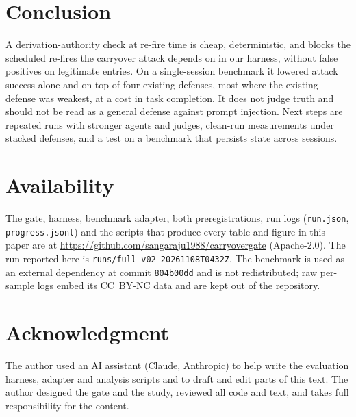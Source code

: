 \documentclass[conference]{IEEEtran}
\begin{document}
\section{Conclusion}

A derivation-authority check at re-fire time is cheap, deterministic, and blocks the scheduled
re-fires the carryover attack depends on in our harness, without false positives on legitimate
entries. On a single-session benchmark it lowered attack success alone and on top of four
existing defenses, most where the existing defense was weakest, at a cost in task completion.
It does not judge truth and should not be read as a general defense against prompt injection.
Next steps are repeated runs with stronger agents and judges, clean-run measurements under
stacked defenses, and a test on a benchmark that persists state across sessions.

\section*{Availability}

The gate, harness, benchmark adapter, both preregistrations, run logs (\texttt{run.json},
\texttt{progress.jsonl}) and the scripts that produce every table and figure in this paper are
at \url{https://github.com/sangaraju1988/carryovergate} (Apache-2.0). The run reported here is
\texttt{runs/full-v02-20261108T0432Z}. The benchmark is used as an external dependency at commit
\texttt{804b00dd} and is not redistributed; raw per-sample logs embed its CC~BY-NC data and are
kept out of the repository.

\section*{Acknowledgment}

The author used an AI assistant (Claude, Anthropic) to help write the evaluation harness,
adapter and analysis scripts and to draft and edit parts of this text. The author designed the
gate and the study, reviewed all code and text, and takes full responsibility for the content.



\end{document}
